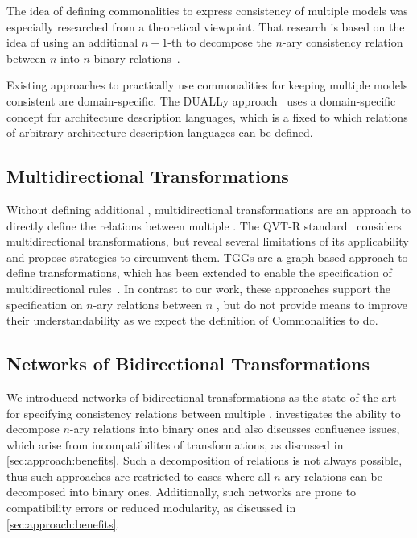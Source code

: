 The idea of defining commonalities to express consistency of multiple models was especially researched from a theoretical viewpoint.
That research is based on the idea of using an additional $n+1$-th \metamodel to decompose the $n$-ary consistency relation between $n$ \metamodels into $n$ binary relations~\cite{stunkel2018a, diskin2018a}.

Existing approaches to practically use commonalities for keeping multiple models consistent are domain-specific. 
The DUALLy approach~\cite{malavolta2010a, eramo2012a} uses a domain-specific concept \metamodel for architecture description languages, which is a fixed \metamodel to which relations of arbitrary architecture description languages can be defined.


\subsection*{Multidirectional Transformations}

Without defining additional \metamodels, multidirectional transformations are an approach to directly define the relations between multiple \metamodels.
The QVT-R standard~\cite{qvt} considers multidirectional transformations, but \textcite{macedo2014a} reveal several limitations of its applicability and propose strategies to circumvent them.
\acp{TGG} are a graph-based approach to define transformations, which has been extended to enable the specification of multidirectional rules~\cite{trollmann2015a, trollmann2016a}.
In contrast to our work, these approaches support the specification on $n$-ary relations between $n$ \metamodels, but do not provide means to improve their understandability as we expect the definition of Commonalities to do.


\subsection*{Networks of Bidirectional Transformations}

We introduced networks of bidirectional transformations as the state-of-the-art for specifying consistency relations between multiple \metamodels.
\textcite{stevens2017a} investigates the ability to decompose $n$-ary relations into binary ones and also discusses confluence issues, which arise from incompatibilites of transformations, as discussed in \autoref{sec:approach:benefits}.
Such a decomposition of relations is not always possible, thus such approaches are restricted to cases where all $n$-ary relations can be decomposed into binary ones.
Additionally, such networks are prone to compatibility errors or reduced modularity, as discussed in \autoref{sec:approach:benefits}.

